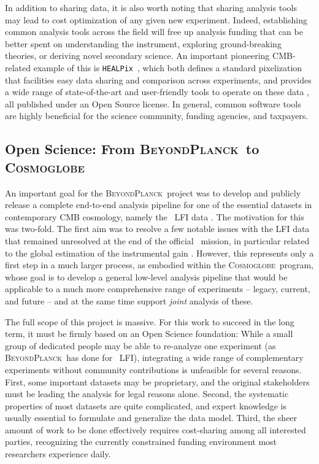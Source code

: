 \documentclass[twocolumn]{aa}
\def\healpix{\texttt{HEALPix}}
\newcommand{\BP}{\textsc{BeyondPlanck}}
\newcommand{\cosmoglobe}{\textsc{Cosmoglobe}}
\begin{document}
In addition to sharing data, it is also worth noting that sharing analysis tools may lead to cost optimization of any given new experiment. Indeed, establishing common analysis tools across the field will free up analysis funding that can be better spent on understanding the instrument, exploring ground-breaking theories, or deriving novel secondary science. An important pioneering CMB-related example of this is \healpix\ \citep{gorski2005}, which both defines a standard pixelization that facilities easy data sharing and comparison across experiments, and provides a wide range of state-of-the-art and user-friendly tools to operate on these data \citep[e.g.,][]{zonca2019}, all published under an Open Source license. In general, common software tools are highly beneficial for the science community, funding agencies, and taxpayers.

\subsection{Open Science: From \BP\ to \cosmoglobe}

An important goal for the \BP\ project was to develop and publicly release a complete end-to-end analysis pipeline for one of the essential datasets in contemporary CMB cosmology, namely the \Planck\ LFI data \citep{bp01}. The motivation for this was two-fold. The first aim was to resolve a few notable issues with the LFI data that remained unresolved at the end of the official \Planck\ mission, in particular related to the global estimation of the instrumental gain \citep{planck2016-l02,bp07}. However, this represents only a first step in a much larger process, as embodied within the \cosmoglobe\ program, whose goal is to develop a general low-level analysis pipeline that would be applicable to a much more comprehensive range of experiments -- legacy, current, and future -- and at the same time support \emph{joint} analysis of these.

The full scope of this project is massive. For this work to succeed in the long term, it must be firmly based on an Open Science foundation: While a small group of dedicated people may be able to re-analyze one experiment (as \BP\ has done for \Planck\ LFI), integrating a wide range of complementary experiments without community contributions is unfeasible for several reasons. First, some important datasets may be proprietary, and the original stakeholders must be leading the analysis for legal reasons alone. Second, the systematic properties of most datasets are quite complicated, and expert knowledge is usually essential to formulate and generalize the data model. Third, the sheer amount of work to be done effectively requires cost-sharing among all interested parties, recognizing the currently constrained funding environment most researchers experience daily.
\end{document}
